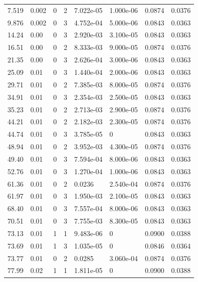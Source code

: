 \documentclass[preview]{standalone}
\begin{document}
{{\begin{tabular}{L{1.2cm}C{1.2cm} C{0.3cm}C{0.5cm} C{1.4cm}C{1.4cm} C{1.4cm}C{1.4cm}}
  7.519  &  0.002  & 0     &  2 &  7.022e-05  & 1.000e-06  & 0.0874 &  0.0376   \\ 
  9.876  &  0.002  & 0     &  3 &  4.752e-04  & 5.000e-06  & 0.0843 &  0.0363   \\ 
  14.24  &  0.00  & 0     &  3 &  2.920e-03  & 3.100e-05  & 0.0843 &  0.0363   \\ 
  16.51  &  0.00  & 0     &  2 &  8.333e-03  & 9.000e-05  & 0.0874 &  0.0376   \\ 
  21.35  &  0.00  & 0     &  3 &  2.626e-04  & 3.000e-06  & 0.0843 &  0.0363   \\ 
  25.09  &  0.01  & 0     &  3 &  1.440e-04  & 2.000e-06  & 0.0843 &  0.0363   \\ 
  29.71  &  0.01  & 0     &  2 &  7.385e-03  & 8.000e-05  & 0.0874 &  0.0376   \\ 
  34.91  &  0.01  & 0     &  3 &  2.354e-03  & 2.500e-05  & 0.0843 &  0.0363   \\ 
  35.23  &  0.01  & 0     &  2 &  2.713e-03  & 2.900e-05  & 0.0874 &  0.0376   \\ 
  44.21  &  0.01  & 0     &  2 &  2.182e-03  & 2.300e-05  & 0.0874 &  0.0376   \\ 
  44.74  &  0.01  & 0     &  3 &  3.785e-05  & 0  & 0.0843 &  0.0363   \\ 
  48.94  &  0.01  & 0     &  2 &  3.952e-03  & 4.300e-05  & 0.0874 &  0.0376   \\ 
  49.40  &  0.01  & 0     &  3 &  7.594e-04  & 8.000e-06  & 0.0843 &  0.0363   \\ 
  52.76  &  0.01  & 0     &  3 &  1.270e-04  & 1.000e-06  & 0.0843 &  0.0363   \\ 
  61.36  &  0.01  & 0     &  2 &  0.0236  & 2.540e-04  & 0.0874 &  0.0376   \\ 
  61.97  &  0.01  & 0     &  3 &  1.950e-03  & 2.100e-05  & 0.0843 &  0.0363   \\ 
  68.40  &  0.01  & 0     &  3 &  7.557e-04  & 8.000e-06  & 0.0843 &  0.0363   \\ 
  70.51  &  0.01  & 0     &  3 &  7.755e-03  & 8.300e-05  & 0.0843 &  0.0363   \\ 
  73.13  &  0.01  & 1     &  1 &  9.483e-06  & 0  & 0.0900 &  0.0388   \\ 
  73.69  &  0.01  & 1     &  3 &  1.035e-05  & 0  & 0.0846 &  0.0364   \\ 
  73.77  &  0.01  & 0     &  2 &  0.0285  & 3.060e-04  & 0.0874 &  0.0376   \\ 
  77.99  &  0.02  & 1     &  1 &  1.811e-05  & 0  & 0.0900 &  0.0388   \\ 

\end{tabular}}}
\end{document}
